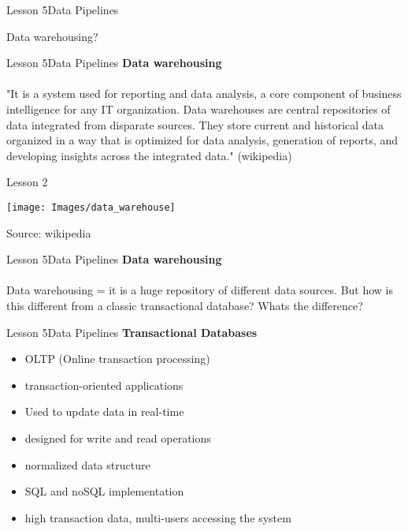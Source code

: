\documentclass[aspectratio=1610]{beamer}
\begin{document}
\begin{frame}{Lesson 5}{Data Pipelines}
\Huge
\begin{center}
Data warehousing?
\end{center}
\end{frame}


\begin{frame}{Lesson 5}{Data Pipelines}
\LARGE
\textbf{Data warehousing}\\~\\
"It is a system used for reporting and data analysis, a core component of 
business intelligence for any IT organization. Data warehouses are central 
repositories of data integrated from disparate sources. They store current and 
historical data organized in a way that is optimized for data analysis, 
generation of reports, and developing insights across the integrated data."
(wikipedia)
\end{frame}


\begin{frame}{Lesson 2}{}
\begin{center}
	\texttt{[image: Images/data\_warehouse]}
\end{center}
Source: wikipedia
\end{frame}



\begin{frame}{Lesson 5}{Data Pipelines}
\LARGE
\textbf{Data warehousing}\\~\\
Data warehousing = it is a huge repository of different data sources.
But how is this different from a classic transactional database? Whats the 
difference?
\end{frame}



\begin{frame}{Lesson 5}{Data Pipelines}
\LARGE
\textbf{Transactional Databases}\\
\begin{itemize}
	\item OLTP (Online transaction processing)
	\item transaction-oriented applications
	\item Used to update data in real-time
	\item designed for write and read operations
	\item normalized data structure
	\item SQL and noSQL implementation
	\item high transaction data, multi-users accessing the system
\end{itemize}
\end{frame}
\end{document}
